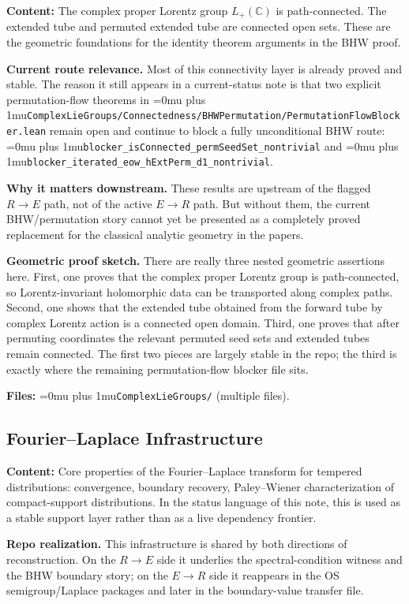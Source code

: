 \documentclass[11pt,a4paper]{article}
\newcommand{\leanfile}[1]{\begingroup\Urlmuskip=0mu plus 1mu\relax\nolinkurl{#1}\endgroup}
\newcommand{\leanname}[1]{\begingroup\Urlmuskip=0mu plus 1mu\relax\nolinkurl{#1}\endgroup}
\begin{document}
\textbf{Content:} The complex proper Lorentz group $L_+(\mathbb{C})$ is
path-connected. The extended tube and permuted extended tube are
connected open sets. These are the geometric foundations for the
identity theorem arguments in the BHW proof.

\medskip\noindent
\textbf{Current route relevance.}
Most of this connectivity layer is already proved and stable. The reason it still
appears in a current-status note is that two explicit permutation-flow theorems in
\leanfile{ComplexLieGroups/Connectedness/BHWPermutation/PermutationFlowBlocker.lean}
remain open and continue to block a fully unconditional BHW route:
\leanname{blocker\_isConnected\_permSeedSet\_nontrivial} and
\leanname{blocker\_iterated\_eow\_hExtPerm\_d1\_nontrivial}.

\medskip\noindent
\textbf{Why it matters downstream.}
These results are upstream of the flagged $R \to E$ path, not of the active
$E \to R$ path. But without them, the current BHW/permutation story cannot yet be
presented as a completely proved replacement for the classical analytic geometry
in the papers.

\medskip\noindent
\textbf{Geometric proof sketch.}
There are really three nested geometric assertions here. First, one proves that
the complex proper Lorentz group is path-connected, so Lorentz-invariant
holomorphic data can be transported along complex paths. Second, one shows that
the extended tube obtained from the forward tube by complex Lorentz action is a
connected open domain. Third, one proves that after permuting coordinates the
relevant permuted seed sets and extended tubes remain connected. The first two
pieces are largely stable in the repo; the third is exactly where the remaining
permutation-flow blocker file sits.

\textbf{Files:} \leanname{ComplexLieGroups/} (multiple files).

\subsection{Fourier--Laplace Infrastructure}

\textbf{Content:} Core properties of the Fourier--Laplace transform for
tempered distributions: convergence, boundary recovery, Paley--Wiener
characterization of compact-support distributions. In the status language of
this note, this is used as a stable support layer rather than as a live
dependency frontier.

\medskip\noindent
\textbf{Repo realization.}
This infrastructure is shared by both directions of reconstruction. On the
$R \to E$ side it underlies the spectral-condition witness and the BHW boundary
story; on the $E \to R$ side it reappears in the OS semigroup/Laplace packages
and later in the boundary-value transfer file.
\end{document}
